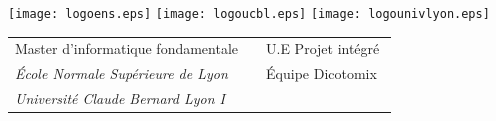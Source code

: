 \documentclass[11pt,a4paper]{article}
\theoremstyle{plain}
\theoremstyle{definition}
\begin{document}
\setlength{\parindent}{0pt}

\thispagestyle{empty}

\texttt{[image: logoens.eps]} \hfill \texttt{[image: logoucbl.eps]} \hfill \texttt{[image: logounivlyon.eps]}

\vspace{0.5cm}

\begin{tabularx}{\textwidth}{@{} l X l @{} }
{\sc Master d'informatique fondamentale} & & U.E Projet intégré\\
{\it École Normale Supérieure de Lyon} & & Équipe Dicotomix\ \\
{\it Université Claude Bernard Lyon I} 
\end{tabularx}
\end{document}
